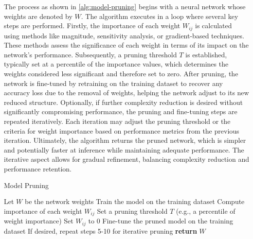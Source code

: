 \documentclass{ioereport}
\begin{document}
    The process as shown in \autoref{alg:model-pruning} begins with a neural network whose weights are denoted by \( W \). The algorithm executes in a loop where several key steps are performed. Firstly, the importance of each weight \( W_{ij} \) is calculated using methods like magnitude, sensitivity analysis, or gradient-based techniques. These methods assess the significance of each weight in terms of its impact on the network’s performance. Subsequently, a pruning threshold \( T \) is established, typically set at a percentile of the importance values, which determines the weights considered less significant and therefore set to zero. After pruning, the network is fine-tuned by retraining on the training dataset to recover any accuracy loss due to the removal of weights, helping the network adjust to its new reduced structure. Optionally, if further complexity reduction is desired without significantly compromising performance, the pruning and fine-tuning steps are repeated iteratively. Each iteration may adjust the pruning threshold or the criteria for weight importance based on performance metrics from the previous iteration. Ultimately, the algorithm returns the pruned network, which is simpler and potentially faster at inference while maintaining adequate performance. The iterative aspect allows for gradual refinement, balancing complexity reduction and performance retention.

    \begin{algorithm}[H]
        \caption{Model Pruning}
        \label{alg:model-pruning}
        \begin{algorithmic}[1]
            \State Let $W$ be the network weights
            \State Train the model on the training dataset
            \Loop
                \State Compute importance of each weight $W_{ij}$
                \State Set a pruning threshold $T$ (e.g., a percentile of weight importance)
                        \State Set $W_{ij}$ to 0
                    \EndIf
                \EndFor
                \State Fine-tune the pruned model on the training dataset
                \State If desired, repeat steps 5-10 for iterative pruning
            \EndLoop
            \State \textbf{return} $W$
            \EndProcedure
        \end{algorithmic}
    \end{algorithm}

    
\end{document}
